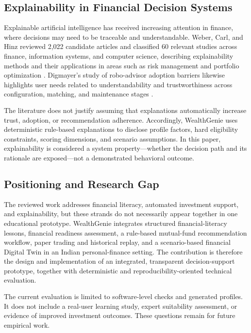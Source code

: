 \subsection{Explainability in Financial Decision Systems}
Explainable artificial intelligence has received increasing attention in finance, where decisions may need to be traceable and understandable. Weber, Carl, and Hinz reviewed 2,022 candidate articles and classified 60 relevant studies across finance, information systems, and computer science, describing explainability methods and their applications in areas such as risk management and portfolio optimization \cite{weberCarlHinz2024}. Digmayer's study of robo-advisor adoption barriers likewise highlights user needs related to understandability and trustworthiness across configuration, matching, and maintenance stages \cite{digmayer2024}.

The literature does not justify assuming that explanations automatically increase trust, adoption, or recommendation adherence. Accordingly, WealthGenie uses deterministic rule-based explanations to disclose profile factors, hard eligibility constraints, scoring dimensions, and scenario assumptions. In this paper, explainability is considered a system property—whether the decision path and its rationale are exposed—not a demonstrated behavioral outcome.

\subsection{Positioning and Research Gap}
The reviewed work addresses financial literacy, automated investment support, and explainability, but these strands do not necessarily appear together in one educational prototype. WealthGenie integrates structured financial-literacy lessons, financial readiness assessment, a rule-based mutual-fund recommendation workflow, paper trading and historical replay, and a scenario-based financial Digital Twin in an Indian personal-finance setting. The contribution is therefore the design and implementation of an integrated, transparent decision-support prototype, together with deterministic and reproducibility-oriented technical evaluation.

The current evaluation is limited to software-level checks and generated profiles. It does not include a real-user learning study, expert suitability assessment, or evidence of improved investment outcomes. These questions remain for future empirical work.
